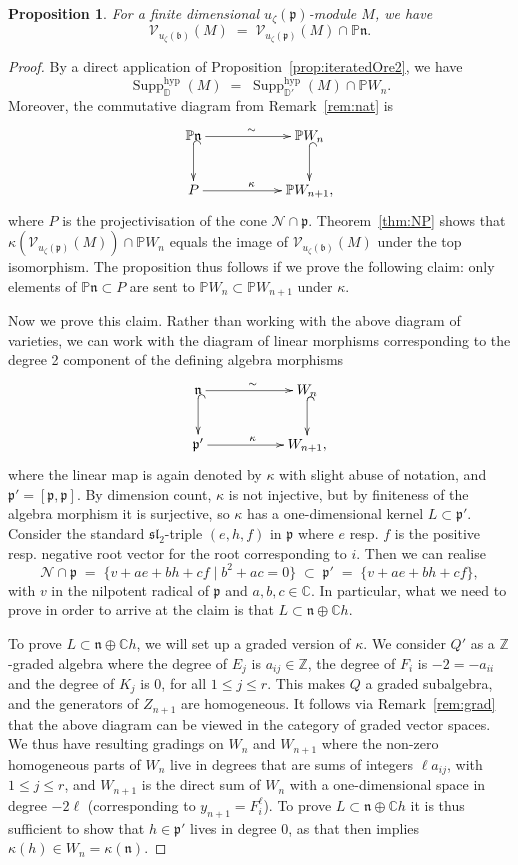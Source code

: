 \documentclass{amsart}
\numberwithin{equation}{section}
\newtheorem{proposition}[subsubsection]{Proposition}
\theoremstyle{definition}
\theoremstyle{remark}
\newcommand{\cN}{\mathcal{N}}
\newcommand{\mZ}{\mathbb{Z}}
\newcommand{\hyp}{\mathrm{hyp}}
\newcommand{\Supp}{\operatorname{Supp}}
\newcommand{\ffp}{\mathfrak{p}}
\newcommand{\cV}{\mathcal{V}}
\newcommand{\mD}{\mathbb{D}}
\newcommand{\mP}{\mathbb{P}}
\newcommand{\fb}{\mathfrak{b}}
\newcommand{\fn}{\mathfrak{n}}
\newcommand{\mC}{\mathbb{C}}
\begin{document}
 
 \begin{proposition}\label{prop:pi}
 For a finite dimensional $u_\zeta(\ffp)$-module $M$, we have
 \[\cV_{u_\zeta(\fb)}(M)\;=\; \cV_{u_\zeta(\ffp)}(M)\cap\mP\fn.\]
 \end{proposition}
\begin{proof}
By a direct application of Proposition~\ref{prop:iteratedOre2}, we have
\[\Supp^{\hyp}_{\mD}(M)\;=\;\Supp^{\hyp}_{\mD'}(M)\cap \mP W_{n}.\]
Moreover, the commutative diagram from Remark~\ref{rem:nat} is
\[\xymatrix{\mP\fn\ar[rr]^{\sim}\ar@{^{(}->}[d]&&\mP W_n\ar@{^{(}->}[d]\\
P\ar[rr]^{\kappa}&&\mP W_{n+1},}\]
where $P$ is the projectivisation of the cone $\cN\cap\ffp$. Theorem~\ref{thm:NP} shows that $\kappa(\cV_{u_\zeta(\ffp)}(M))\cap \mP W_n$ equals the image of $\cV_{u_\zeta(\fb)}(M)$ under the top isomorphism. The proposition thus follows if we prove the following claim: only elements of $\mP\fn\subset P$ are sent to $\mP W_n\subset\mP W_{n+1}$ under $\kappa$.

Now we prove this claim. Rather than working with the above diagram of varieties, we can work with the diagram of linear morphisms corresponding to the degree 2 component of the defining algebra morphisms
\[\xymatrix{\fn\ar[rr]^{\sim}\ar@{^{(}->}[d]&&W_n\ar@{^{(}->}[d]\\
\ffp'\ar[rr]^{\kappa}&&W_{n+1},}\]
where the linear map is again denoted by $\kappa$ with slight abuse of notation, and $\ffp'=[\ffp,\ffp]$. By dimension count, $\kappa$ is not injective, but by finiteness of the algebra morphism it is surjective, so $\kappa$ has a one-dimensional kernel $L\subset\ffp'$.
Consider the standard $\mathfrak{sl}_2$-triple $(e, h, f)$ in $\ffp$ where $e$ resp. $f$ is the positive resp. negative root vector for the root corresponding to $i$. Then we can realise
\[\cN\cap\ffp\;=\;\{v+ae+bh+cf\mid b^2+ac=0\}\;\subset\; \ffp'\;=\; \{v+ae+bh+cf\},\]
with $v$ in the nilpotent radical of $\ffp$ and $a,b,c\in\mC$. In particular, what we need to prove in order to arrive at the claim is that $L\subset \fn\oplus \mC h$.


To prove $L\subset \fn\oplus \mC h$, we will set up a graded version of $\kappa$. We consider $Q'$ as a $\mZ$-graded algebra where the degree of $E_j$ is $a_{ij}\in\mZ$, the degree of $F_i$ is $-2=-a_{ii}$ and the degree of $K_j$ is $0$, for all $1\le j\le r$. This makes $Q$ a graded subalgebra, and the generators of $Z_{n+1}$ are homogeneous. It follows via Remark~\ref{rem:grad} that the above diagram can be viewed in the category of graded vector spaces. We thus have resulting gradings on $W_n$ and $W_{n+1}$ where the non-zero homogeneous parts of $W_n$ live in degrees that are sums of integers $\ell a_{ij}$, with $1\le j\le r$, and $W_{n+1}$ is the direct sum of $W_n$ with a one-dimensional space in degree $-2\ell$ (corresponding to $y_{n+1}=F_i^{\ell}$). To prove $L\subset \fn\oplus \mC h$ it is thus sufficient to show that $h\in\ffp'$ lives in degree $0$, as that then implies $\kappa(h)\in W_n=\kappa(\fn)$. 


\end{proof}
\end{document}
